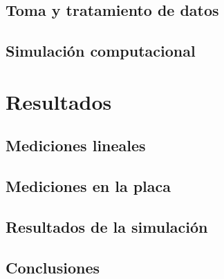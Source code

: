 \documentclass[12pt]{article}
\begin{document}
\subsection{Toma y tratamiento de datos}
\subsection{Simulación computacional}

\section{Resultados}
\subsection{Mediciones lineales}
\subsection{Mediciones en la placa}
\subsection{Resultados de la simulación}
\subsection{Conclusiones}
\end{document}

